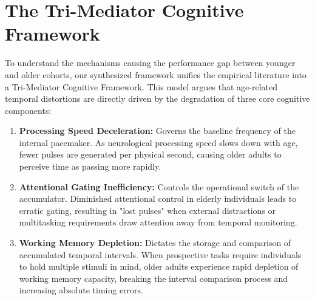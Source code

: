 \documentclass{custom_report}
\begin{document}
\section{The Tri-Mediator Cognitive Framework}
To understand the mechanisms causing the performance gap between younger and older cohorts, our synthesized framework unifies the empirical literature into a Tri-Mediator Cognitive Framework. This model argues that age-related temporal distortions are directly driven by the degradation of three core cognitive components:
\begin{enumerate}
    \item \textbf{Processing Speed Deceleration:} Governs the baseline frequency of the internal pacemaker. As neurological processing speed slows down with age, fewer pulses are generated per physical second, causing older adults to perceive time as passing more rapidly.
    \item \textbf{Attentional Gating Inefficiency:} Controls the operational switch of the accumulator. Diminished attentional control in elderly individuals leads to erratic gating, resulting in "lost pulses" when external distractions or multitasking requirements draw attention away from temporal monitoring.
    \item \textbf{Working Memory Depletion:} Dictates the storage and comparison of accumulated temporal intervals. When prospective tasks require individuals to hold multiple stimuli in mind, older adults experience rapid depletion of working memory capacity, breaking the interval comparison process and increasing absolute timing errors.
\end{enumerate}
\end{document}
